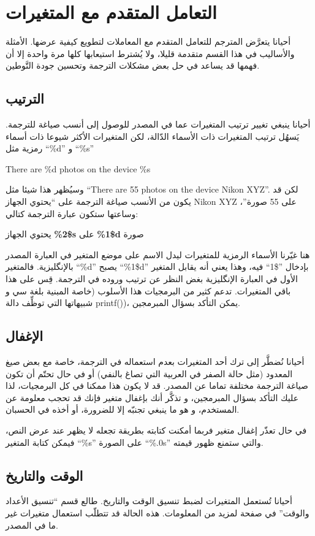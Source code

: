 \section[ref:43252826]{التعامل المتقدم مع المتغيرات}
أحيانا يتعرَّض المترجم للتعامل
المتقدم مع المعاملات لتطويع كيفية عرضها. الأمثلة والأساليب في هذا القسم
متقدمة قليلا، ولا يُشترط استيعابها كلها مرة واحدة إلا أن فهمها قد يساعد
في حل بعض مشكلات الترجمة وتحسين جودة التَّوطين.

\subsection{الترتيب}
أحيانا ينبغي تغيير ترتيب المتغيرات عما في المصدر للوصول إلى أنسب صياغة
للترجمة. يَسهُل ترتيب المتغيرات ذات الأسماء الدّالة، لكن المتغيرات
الأكثر شيوعا ذات أسماء رمزية مثل ‪“\%d”‬ و ‪“\%s”‬

There are \%d photos on the device \%s

وسيُظهر هذا شيئا مثل “There are 55 photos on the device Nikon XYZ”. لكن
قد يكون من الأنسب صياغة الترجمة على “يحتوي الجهاز Nikon XYZ على 55
صورة”، وساعتها ستكون عبارة الترجمة كتالي:

يحتوي الجهاز ‪{\bf \%2\$s}‬ على ‪{\bf \%1\$d}‬ صورة

هنا غيّرنا الأسماء الرمزية للمتغيرات ليدل الاسم على موضع المتغير في
العبارة المصدر بالإنگليزية. فالمتغير ‪“\%d”‬ يصبح ‪“\%1\$d”‬ بإدخال
”\$1“ فيه، وهذا يعني أنه يقابل المتغير الأول في العبارة الإنگليزية بغض
النظر عن ترتيب وروده في الترجمة. قِس على هذا باقي المتغيرات. تدعم كثير
من البرمجيات هذا الأسلوب (خاصة المبنية بلغة سي و شبيهاتها التي توظِّف
دالة ‪printf()‬)، يمكن التأكد بسؤال المبرمجين.

\subsection{الإغفال}
أحيانا نُضطَّر إلى ترك أحد المتغيرات بعدم استعماله في الترجمة، خاصة مع
بعض صيغ المعدود (مثل حالة الصفر في العربية التي تصاغ بالنفي) أو في حال
تحتّم أن تكون صياغة الترجمة مختلفة تماما عن المصدر. قد لا يكون هذا
ممكنا في كل البرمجيات، لذا عليك التأكد بسؤال المبرمجين، و تذكَّر أنك
بإغفال متغير فإنك قد تحجب معلومة عن المستخدم، و هو ما ينبغي تجنبّه إلا
للضرورة، أو أخذه في الحسبان.

في حال تعذّر إغفال متغير فربما أمكنت كتابته بطريقة تجعله لا يظهر عند عرض
النص، فيمكن كتابة المتغير ‪“\%s”‬ على الصورة ‪“\%.0s”‬ والتي ستمنع ظهور
قيمته.

\subsection[ref:43524426]{الوقت والتاريخ}
أحيانا تُستعمل المتغيرات لضبط
تنسيق الوقت والتاريخ. طالع قسم “تنسيق الأعداد والوقت” في صفحة
\at[ref:30596701] لمزيد من المعلومات. هذه الحالة قد تتطلّب
استعمال متغيرات غير ما في المصدر.

